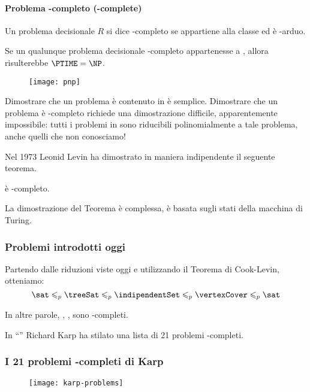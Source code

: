 \paragraph{Problema {\NP}-completo ({\NP}-complete)}
Un problema decisionale \(R\) si dice {\NP}-completo se appartiene alla classe {\NP} ed è {\NP}-arduo.

\begin{note}
Se un qualunque problema decisionale {\NP}-completo appartenesse a {\PTIME}, allora risulterebbe \(\PTIME = \NP\).
\end{note}

\begin{figure}[H]\centering
    \texttt{[image: pnp]}
\end{figure}

Dimostrare che un problema è contenuto in {\NP} è semplice.
Dimostrare che un problema è {\NP}-completo richiede una dimostrazione difficile, apparentemente impossibile: tutti i problemi in {\NP} sono riducibili polinomialmente a tale problema, anche quelli che non conosciamo!

Nel 1973 Leonid Levin ha dimostrato in maniera indipendente il seguente teorema.
\begin{theorem*}
{\sat} è {\NP}-completo.
\end{theorem*}
La dimostrazione del Teorema è complessa, è basata sugli stati della macchina di Turing.

\subsubsection*{Problemi introdotti oggi}

Partendo dalle riduzioni viste oggi e utilizzando il Teorema di Cook-Levin, otteniamo:
\[
    {\sat} \leqslant_p {\treeSat} \leqslant_p {\indipendentSet} \leqslant_p {\vertexCover} \leqslant_p {\sat}
\]

In altre parole, {\treeSat}, {\indipendentSet}, {\vertexCover} sono {\NP}-completi.

In \enquote{} Richard Karp ha stilato una lista di 21 problemi {\NP}-completi.

\subsubsection*{I 21 problemi {\NP}-completi di Karp}

\begin{figure}[H]\centering
    \texttt{[image: karp-problems]}
\end{figure}

